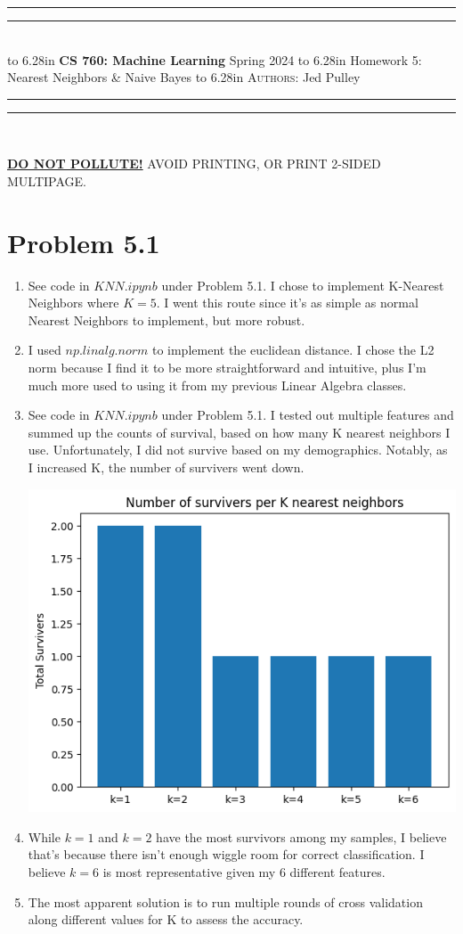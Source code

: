 \documentclass{article}
\newcommand{\lecture}[2]{
\pagestyle{myheadings}
\thispagestyle{plain}
\newpage
\noindent
\begin{center}
\rule{\textwidth}{1.6pt}\vspace*{-\baselineskip}\vspace*{2pt} %
\rule{\textwidth}{0.4pt}\\[1\baselineskip] %
\vbox{\vspace{2mm}
\hbox to 6.28in { {\bf CS 760: Machine Learning} \hfill Spring 2024 }
\vspace{4mm}
\hbox to 6.28in { {\Large \hfill #1  \hfill} }
\vspace{4mm}
\hbox to 6.28in { {\scshape Authors:}  #2 \hfill }}
\vspace{-2mm}
\rule{\textwidth}{0.4pt}\vspace*{-\baselineskip}\vspace{3.2pt} %
\rule{\textwidth}{1.6pt}\\[\baselineskip] %
\end{center}
\vspace*{4mm}
}
\begin{document}
\lecture{Homework 5: Nearest Neighbors \& Naive Bayes}{Jed Pulley}

\begin{center}
{\Large {\sf \underline{\textbf{DO NOT POLLUTE!}} AVOID PRINTING, OR PRINT 2-SIDED MULTIPAGE.}}
\end{center}

\section*{Problem 5.1}
  \begin{enumerate}[label=(\alph*)]
    \item See code in $KNN.ipynb$ under Problem 5.1. I chose to implement K-Nearest Neighbors where $K=5$. I went this route since it's as simple as normal Nearest Neighbors to implement, but more robust.
    \item I used $np.linalg.norm$ to implement the euclidean distance. I chose the L2 norm because I find it to be more straightforward and intuitive, plus I'm much more used to using it from my previous Linear Algebra classes.
    \item See code in $KNN.ipynb$ under Problem 5.1. I tested out multiple features and summed up the counts of survival, based on how many K nearest neighbors I use. Unfortunately, I did not survive based on my demographics. Notably, as I increased K, the number of survivers went down. \\
    \parbox{\linewidth}{\centering \includegraphics[scale=0.6]{bar_plot.png}}
    \item While $k=1$ and $k=2$ have the most survivors among my samples, I believe that's because there isn't enough wiggle room for correct classification. I believe $k=6$ is most representative given my 6 different features.
    \item The most apparent solution is to run multiple rounds of cross validation along different values for K to assess the accuracy.
  \end{enumerate}
\end{document}
